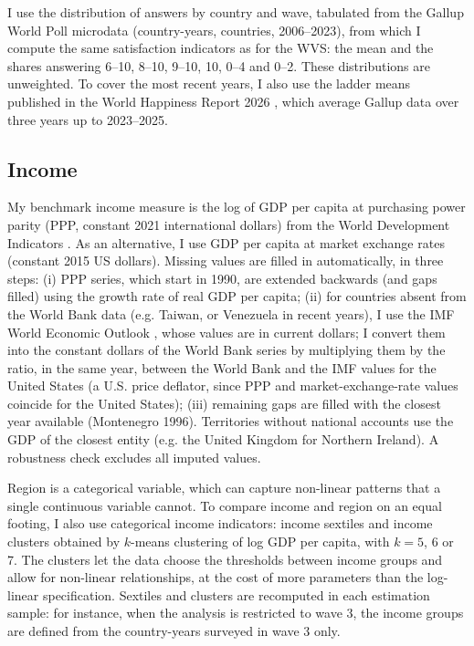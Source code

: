 \documentclass[12pt]{article}
\begin{document}
I use the distribution of answers by country and wave, tabulated from the Gallup World Poll microdata (\nGallupCountryYears country-years, \nGallupCountries countries, 2006--2023), from which I compute the same satisfaction indicators as for the WVS: the mean and the shares answering 6--10, 8--10, 9--10, 10, 0--4 and 0--2. These distributions are unweighted. %
To cover the most recent years, I also use the ladder means published in the World Happiness Report 2026 \citep{whr_2026}, which average Gallup data over three years up to 2023--2025.

\subsection{Income}\label{subsec:income}

My benchmark income measure is the log of GDP per capita at purchasing power parity (PPP, constant 2021 international dollars) from the World Development Indicators \citep{worldbank_wdi_2026}. As an alternative, I use GDP per capita at market exchange rates (constant 2015 US dollars). Missing values are filled in automatically, in three steps: (i) PPP series, which start in 1990, are extended backwards (and gaps filled) using the growth rate of real GDP per capita; (ii) for countries absent from the World Bank data (e.g. Taiwan, or Venezuela in recent years), I use the IMF World Economic Outlook \citep{imf_weo_2026}, whose values are in current dollars; I convert them into the constant dollars of the World Bank series by multiplying them by the ratio, in the same year, between the World Bank and the IMF values for the United States (a U.S. price deflator, since PPP and market-exchange-rate values coincide for the United States); (iii) remaining gaps are filled with the closest year available (Montenegro 1996). Territories without national accounts use the GDP of the closest entity (e.g. the United Kingdom for Northern Ireland). A robustness check excludes all imputed values.

\ifshowregion
Region is a categorical variable, which can capture non-linear patterns that a single continuous variable cannot. To compare income and region on an equal footing, I also use categorical income indicators: income sextiles and income clusters obtained by $k$-means clustering of log GDP per capita, with $k = 5$, 6 or 7. The clusters let the data choose the thresholds between income groups and allow for non-linear relationships, at the cost of more parameters than the log-linear specification. Sextiles and clusters are recomputed in each estimation sample: for instance, when the analysis is restricted to wave 3, the income groups are defined from the country-years surveyed in wave 3 only.
\fi
\end{document}
